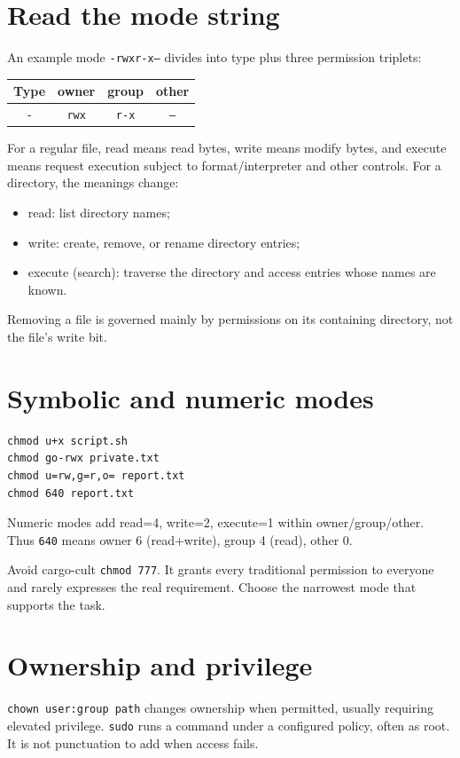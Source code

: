 \documentclass[11pt,oneside,openany]{book}
\begin{document}
\section{Read the mode string}
An example mode \texttt{-rwxr-x---} divides into type plus three permission triplets:
\begin{center}
\begin{tabular}{c c c c}
\toprule
Type & owner & group & other \\
\midrule
\texttt{-} & \texttt{rwx} & \texttt{r-x} & \texttt{---} \\
\bottomrule
\end{tabular}
\end{center}
For a regular file, read means read bytes, write means modify bytes, and execute means request execution subject to format/interpreter and other controls. For a directory, the meanings change:
\begin{itemize}
  \item read: list directory names;
  \item write: create, remove, or rename directory entries;
  \item execute (search): traverse the directory and access entries whose names are known.
\end{itemize}
Removing a file is governed mainly by permissions on its containing directory, not the file's write bit.

\section{Symbolic and numeric modes}
\begin{lstlisting}
chmod u+x script.sh
chmod go-rwx private.txt
chmod u=rw,g=r,o= report.txt
chmod 640 report.txt
\end{lstlisting}
Numeric modes add read=4, write=2, execute=1 within owner/group/other. Thus \texttt{640} means owner 6 (read+write), group 4 (read), other 0.

Avoid cargo-cult \texttt{chmod 777}. It grants every traditional permission to everyone and rarely expresses the real requirement. Choose the narrowest mode that supports the task.

\section{Ownership and privilege}
\texttt{chown user:group path} changes ownership when permitted, usually requiring elevated privilege. \texttt{sudo} runs a command under a configured policy, often as root. It is not punctuation to add when access fails.
\end{document}
